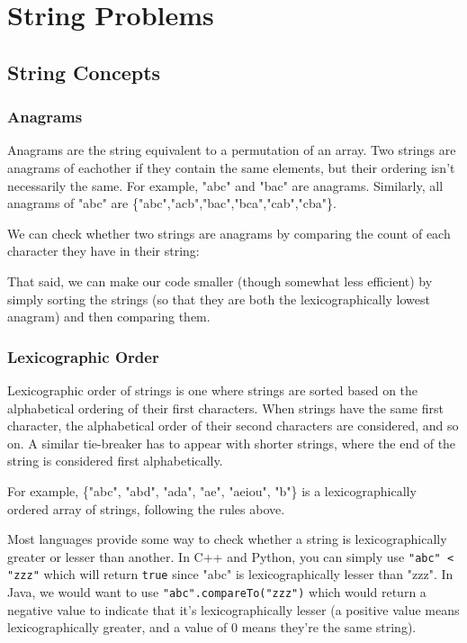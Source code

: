 \section{String Problems}

\subsection{String Concepts}

\subsubsection{Anagrams}

Anagrams are the string equivalent to a permutation of an array. Two strings are anagrams of eachother if they contain the same elements, but their ordering isn't necessarily the same. For example, "abc" and "bac" are anagrams. Similarly, all anagrams of "abc" are \{"abc","acb","bac","bca","cab","cba"\}.

We can check whether two strings are anagrams by comparing the count of each character they have in their string:


That said, we can make our code smaller (though somewhat less efficient) by simply sorting the strings (so that they are both the lexicographically lowest anagram) and then comparing them.


\subsubsection{Lexicographic Order}

Lexicographic order of strings is one where strings are sorted based on the alphabetical ordering of their first characters. When strings have the same first character, the alphabetical order of their second characters are considered, and so on. A similar tie-breaker has to appear with shorter strings, where the end of the string is considered first alphabetically.

For example, \{"abc", "abd", "ada", "ae", "aeiou", "b"\} is a lexicographically ordered array of strings, following the rules above.

Most languages provide some way to check whether a string is lexicographically greater or lesser than another. In C++ and Python, you can simply use \texttt{"abc" < "zzz"} which will return \texttt{true} since "abc" is lexicographically lesser than "zzz". In Java, we would want to use \texttt{"abc".compareTo("zzz")} which would return a negative value to indicate that it's lexicographically lesser (a positive value means lexicographically greater, and a value of 0 means they're the same string).

